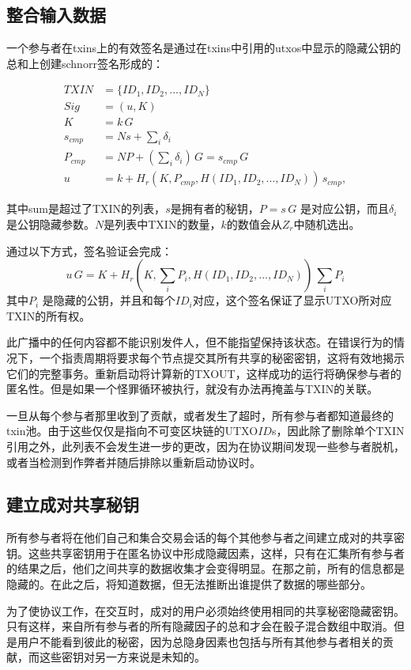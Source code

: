 \documentclass[8pt,fleqn,openany]{book}
\begin{document}
\begin{CJK*}{UTF8}{gbsn}
{\subsection{整合输入数据} 
一个参与者在txins上的有效签名是通过在txins中引用的utxos中显示的隐藏公钥的总和上创建schnorr签名形成的：

\begin{align*}
TXIN &= \{ID_1, ID_2, ..., ID_N\}\\
Sig &= (u, K)\\
K &= k \, G \\
s_{cmp} &= N s + \sum_i{\delta_i}\\
P_{cmp} &= N P + (\sum_i{\delta_i})\, G = s_{cmp} \, G\\
u &= k + H_r(K, P_{cmp}, H(ID_1, ID_2, ..., ID_N)) \, s_{cmp},
\end{align*}

其中sum是超过了TXIN的列表，$s$是拥有者的秘钥，$P = s \, G$ 是对应公钥，而且$\delta_i$是公钥隐藏参数。$N$是列表中TXIN的数量，$k$的数值会从$Z_r$中随机选出。

通过以下方式，签名验证会完成：
$$u \, G = K + H_r(K, \sum_i{P_i}, H(ID_1, ID_2, ..., ID_N)) \, \sum_i{P_i}$$
其中$P_i$ 是隐藏的公钥，并且和每个$ID_i$对应，这个签名保证了显示UTXO所对应TXIN的所有权。

此广播中的任何内容都不能识别发件人，但不能指望保持该状态。在错误行为的情况下，一个指责周期将要求每个节点提交其所有共享的秘密密钥，这将有效地揭示它们的完整事务。重新启动将计算新的TXOUT，这样成功的运行将确保参与者的匿名性。但是如果一个怪罪循环被执行，就没有办法再掩盖与TXIN的关联。

一旦从每个参与者那里收到了贡献，或者发生了超时，所有参与者都知道最终的txin池。由于这些仅仅是指向不可变区块链的UTXO$ID$s，因此除了删除单个TXIN引用之外，此列表不会发生进一步的更改，因为在协议期间发现一些参与者脱机，或者当检测到作弊者并随后排除以重新启动协议时。

\subsection{建立成对共享秘钥} 
所有参与者将在他们自己和集合交易会话的每个其他参与者之间建立成对的共享密钥。这些共享密钥用于在匿名协议中形成隐藏因素，这样，只有在汇集所有参与者的结果之后，他们之间共享的数据收集才会变得明显。在那之前，所有的信息都是隐藏的。在此之后，将知道数据，但无法推断出谁提供了数据的哪些部分。

为了使协议工作，在交互时，成对的用户必须始终使用相同的共享秘密隐藏密钥。只有这样，来自所有参与者的所有隐藏因子的总和才会在骰子混合数组中取消。但是用户不能看到彼此的秘密，因为总隐身因素也包括与所有其他参与者相关的贡献，而这些密钥对另一方来说是未知的。

}
\end{CJK*}
\end{document}
